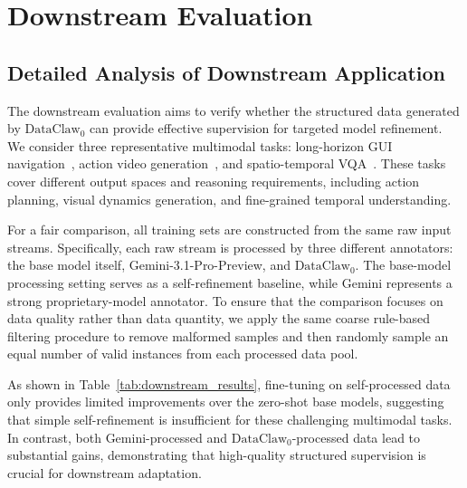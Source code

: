 \documentclass{llmxive}
\begin{document}







\section{Downstream Evaluation}
\label{app:downstream_protocols}

\subsection{Detailed Analysis of Downstream Application}
\label{app:downstream}

The downstream evaluation aims to verify whether the structured data generated by $\text{DataClaw}_0$ can provide effective supervision for targeted model refinement. We consider three representative multimodal tasks: long-horizon GUI navigation~\cite{wang2025opencua}, action video generation~\cite{grauman2022ego4d}, and spatio-temporal VQA~\cite{remot}. These tasks cover different output spaces and reasoning requirements, including action planning, visual dynamics generation, and fine-grained temporal understanding.

For a fair comparison, all training sets are constructed from the same raw input streams. Specifically, each raw stream is processed by three different annotators: the base model itself, Gemini-3.1-Pro-Preview, and $\text{DataClaw}_0$. The base-model processing setting serves as a self-refinement baseline, while Gemini represents a strong proprietary-model annotator. To ensure that the comparison focuses on data quality rather than data quantity, we apply the same coarse rule-based filtering procedure to remove malformed samples and then randomly sample an equal number of valid instances from each processed data pool.

As shown in Table~\ref{tab:downstream_results}, fine-tuning on self-processed data only provides limited improvements over the zero-shot base models, suggesting that simple self-refinement is insufficient for these challenging multimodal tasks. In contrast, both Gemini-processed and $\text{DataClaw}_0$-processed data lead to substantial gains, demonstrating that high-quality structured supervision is crucial for downstream adaptation.
\end{document}
